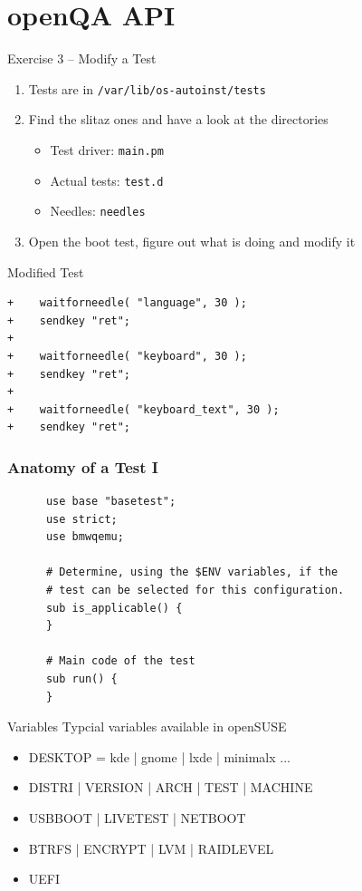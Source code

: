 \documentclass{beamer}
\begin{document}
\section{openQA API}
%
%
\begin{frame}{Exercise 3 -- Modify a Test}
  \begin{enumerate}
  \item Tests are in \texttt{/var/lib/os-autoinst/tests}
  \item Find the slitaz ones and have a look at the directories
  \begin{itemize}
    \item Test driver: \texttt{main.pm}
    \item Actual tests: \texttt{test.d}
    \item Needles: \texttt{needles}
  \end{itemize}
  \item Open the boot test, figure out what is doing and modify it
  \end{enumerate}
\end{frame}

\begin{frame}[fragile]{Modified Test}
    \begin{lstlisting}
+    waitforneedle( "language", 30 );
+    sendkey "ret";
+
+    waitforneedle( "keyboard", 30 );
+    sendkey "ret";
+
+    waitforneedle( "keyboard_text", 30 );
+    sendkey "ret";
    \end{lstlisting}
\end{frame}


%
%
%
%
\begin{frame}[fragile]
  \frametitle{Anatomy of a Test I}
    \lstset{style=myperl}
    \begin{lstlisting}
      use base "basetest";
      use strict;
      use bmwqemu;

      # Determine, using the $ENV variables, if the
      # test can be selected for this configuration.
      sub is_applicable() {
      }

      # Main code of the test
      sub run() {
      }
    \end{lstlisting}
\end{frame}


\begin{frame}{Variables}
  Typcial variables available in openSUSE
  \begin{itemize}
  \item DESKTOP = kde | gnome | lxde | minimalx ...
  \item DISTRI | VERSION | ARCH | TEST | MACHINE
  \item USBBOOT | LIVETEST | NETBOOT
  \item BTRFS | ENCRYPT | LVM | RAIDLEVEL
  \item UEFI
  \end{itemize}
\end{frame}
\end{document}
